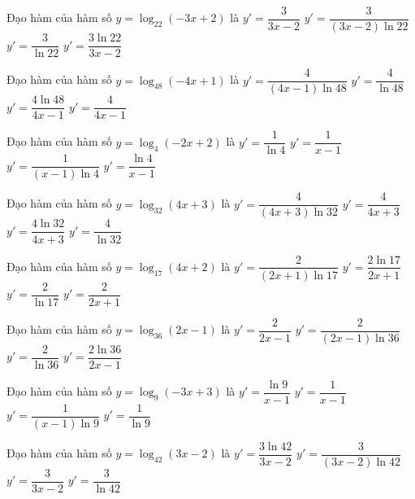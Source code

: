 \documentclass[12pt,a4paper]{article}
\begin{document}
\begin{ex}
Đạo hàm của hàm số $y=\log_{22}(-3x+2)$ là
\choice
{$y'=\dfrac{3}{3x-2}$}
{\True $y'=\dfrac{3}{(3x-2)\ln 22}$}
{$y'=\dfrac{3}{\ln{22}}$}
{$y'=\dfrac{3\ln{22}}{3x-2}$}
\end{ex}
\begin{ex}
Đạo hàm của hàm số $y=\log_{48}(-4x+1)$ là
\choice
{\True $y'=\dfrac{4}{(4x-1)\ln 48}$}
{$y'=\dfrac{4}{\ln{48}}$}
{$y'=\dfrac{4\ln{48}}{4x-1}$}
{$y'=\dfrac{4}{4x-1}$}
\end{ex}
\begin{ex}
Đạo hàm của hàm số $y=\log_4(-2x+2)$ là
\choice
{$y'=\dfrac{1}{\ln{4}}$}
{$y'=\dfrac{1}{x-1}$}
{\True $y'=\dfrac{1}{(x-1)\ln 4}$}
{$y'=\dfrac{\ln{4}}{x-1}$}
\end{ex}
\begin{ex}
Đạo hàm của hàm số $y=\log_{32}(4x+3)$ là
\choice
{\True $y'=\dfrac{4}{(4x+3)\ln 32}$}
{$y'=\dfrac{4}{4x+3}$}
{$y'=\dfrac{4\ln{32}}{4x+3}$}
{$y'=\dfrac{4}{\ln{32}}$}
\end{ex}
\begin{ex}
Đạo hàm của hàm số $y=\log_{17}(4x+2)$ là
\choice
{\True $y'=\dfrac{2}{(2x+1)\ln 17}$}
{$y'=\dfrac{2\ln{17}}{2x+1}$}
{$y'=\dfrac{2}{\ln{17}}$}
{$y'=\dfrac{2}{2x+1}$}
\end{ex}
\begin{ex}
Đạo hàm của hàm số $y=\log_{36}(2x-1)$ là
\choice
{$y'=\dfrac{2}{2x-1}$}
{\True $y'=\dfrac{2}{(2x-1)\ln 36}$}
{$y'=\dfrac{2}{\ln{36}}$}
{$y'=\dfrac{2\ln{36}}{2x-1}$}
\end{ex}
\begin{ex}
Đạo hàm của hàm số $y=\log_9(-3x+3)$ là
\choice
{$y'=\dfrac{\ln{9}}{x-1}$}
{$y'=\dfrac{1}{x-1}$}
{\True $y'=\dfrac{1}{(x-1)\ln 9}$}
{$y'=\dfrac{1}{\ln{9}}$}
\end{ex}
\begin{ex}
Đạo hàm của hàm số $y=\log_{42}(3x-2)$ là
\choice
{$y'=\dfrac{3\ln{42}}{3x-2}$}
{\True $y'=\dfrac{3}{(3x-2)\ln 42}$}
{$y'=\dfrac{3}{3x-2}$}
{$y'=\dfrac{3}{\ln{42}}$}
\end{ex}
\end{document}
